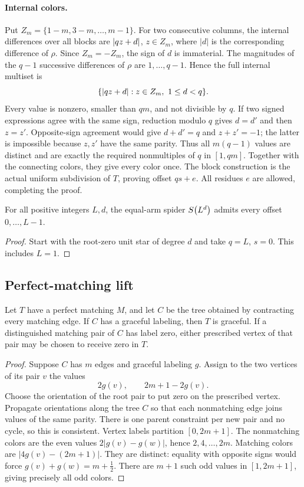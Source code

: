 \paragraph{Internal colors.}
Put $Z_m=\{1-m,3-m,\ldots,m-1\}$. For two consecutive columns,
the internal differences over all blocks are $\left|qz+d\right|$,
$z\in Z_m$, where $|d|$ is the corresponding difference of $\rho$.
Since $Z_m=-Z_m$, the sign of $d$ is immaterial. The magnitudes of
the $q-1$ successive differences of $\rho$ are $1,\ldots,q-1$.
Hence the full internal multiset is
\begin{equation}\label{eq:subdivision-internal-colors}
 \{\left|qz+d\right|:z\in Z_m,\ 1\le d<q\}.
\end{equation}
Every value is nonzero, smaller than $qm$, and not divisible by $q$.
If two signed expressions agree with the same sign, reduction modulo
$q$ gives $d=d'$ and then $z=z'$. Opposite-sign agreement would give
$d+d'=q$ and $z+z'=-1$; the latter is impossible because $z,z'$ have
the same parity. Thus all $m(q-1)$ values are distinct and are exactly
the required nonmultiples of $q$ in $[1,qm]$. Together with the
connecting colors, they give every color once. The block construction
is the actual uniform subdivision of $T$, proving offset $qs+e$.
All residues $e$ are allowed, completing the proof.

\begin{corollary}\label{common:equal-offsets}
For all positive integers $L,d$, the equal-arm spider $S\!\left(L^d\right)$
admits every offset $0,\ldots,L-1$.
\end{corollary}
\begin{proof}
Start with the root-zero unit star of degree $d$ and take $q=L$,
$s=0$. This includes $L=1$.
\end{proof}

\subsection{Perfect-matching lift}
\begin{theorem}\label{common:matching-lift}
Let $T$ have a perfect matching $M$, and let $C$ be the tree obtained
by contracting every matching edge. If $C$ has a graceful labeling,
then $T$ is graceful. If a distinguished matching pair of $C$ has
label zero, either prescribed vertex of that pair may be chosen to
receive zero in $T$.
\end{theorem}
\begin{proof}
Suppose $C$ has $m$ edges and graceful labeling $g$. Assign to the
two vertices of its pair $v$ the values
\[
 2g(v),\qquad 2m+1-2g(v).
\]
Choose the orientation of the root pair to put zero on the prescribed
vertex. Propagate orientations along the tree $C$ so that each
nonmatching edge joins values of the same parity. There is one parent
constraint per new pair and no cycle, so this is consistent. Vertex
labels partition $[0,2m+1]$. The nonmatching colors are the even
values $2|g(v)-g(w)|$, hence $2,4,\ldots,2m$. Matching colors are
$|4g(v)-(2m+1)|$. They are distinct: equality with opposite signs
would force $g(v)+g(w)=m+\tfrac12$. There are $m+1$ such odd
values in $[1,2m+1]$, giving precisely all odd colors.
\end{proof}

